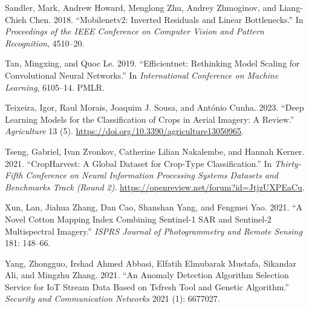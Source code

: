 \documentclass[
  journal,
  twocolumn]{IEEEtran}
\newlength{\cslhangindent}
\newlength{\cslentryspacingunit} %
\newenvironment{CSLReferences}[2] %
 {%
  \setlength{\parindent}{0pt}
  \ifodd #1
  \let\oldpar\par
  \def\par{\hangindent=\cslhangindent\oldpar}
  \fi
  \setlength{\parskip}{#2\cslentryspacingunit}
 }%
 {}
\begin{document}
\begin{CSLReferences}{1}{0}
\leavevmode{}%
Sandler, Mark, Andrew Howard, Menglong Zhu, Andrey Zhmoginov, and
Liang-Chieh Chen. 2018. {``Mobilenetv2: Inverted Residuals and Linear
Bottlenecks.''} In \emph{Proceedings of the IEEE Conference on Computer
Vision and Pattern Recognition}, 4510--20.

\leavevmode{}%
Tan, Mingxing, and Quoc Le. 2019. {``Efficientnet: Rethinking Model
Scaling for Convolutional Neural Networks.''} In \emph{International
Conference on Machine Learning}, 6105--14. PMLR.

\leavevmode{}%
Teixeira, Igor, Raul Morais, Joaquim J. Sousa, and António Cunha. 2023.
{``Deep Learning Models for the Classification of Crops in Aerial
Imagery: A Review.''} \emph{Agriculture} 13 (5).
\url{https://doi.org/10.3390/agriculture13050965}.

\leavevmode{}%
Tseng, Gabriel, Ivan Zvonkov, Catherine Lilian Nakalembe, and Hannah
Kerner. 2021. {``CropHarvest: A Global Dataset for Crop-Type
Classification.''} In \emph{Thirty-Fifth Conference on Neural
Information Processing Systems Datasets and Benchmarks Track (Round 2)}.
\url{https://openreview.net/forum?id=JtjzUXPEaCu}.

\leavevmode{}%
Xun, Lan, Jiahua Zhang, Dan Cao, Shanshan Yang, and Fengmei Yao. 2021.
{``A Novel Cotton Mapping Index Combining Sentinel-1 SAR and Sentinel-2
Multispectral Imagery.''} \emph{ISPRS Journal of Photogrammetry and
Remote Sensing} 181: 148--66.

\leavevmode{}%
Yang, Zhongguo, Irshad Ahmed Abbasi, Elfatih Elmubarak Mustafa, Sikandar
Ali, and Mingzhu Zhang. 2021. {``An Anomaly Detection Algorithm
Selection Service for IoT Stream Data Based on Tsfresh Tool and Genetic
Algorithm.''} \emph{Security and Communication Networks} 2021 (1):
6677027.

\end{CSLReferences}
\end{document}
